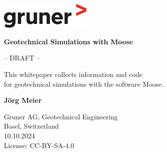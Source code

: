 \begin{titlepage}
    \begin{flushright}
        \includegraphics[width=4.5cm]{img/gruner.pdf}
    \end{flushright}
    \begin{center}
        \vspace*{5cm}

        {\Huge\textbf{Geotechnical Simulations with Moose}}

        \vspace{5cm}

        \large{-- DRAFT --}

        \vfill

        \large{This whitepaper collects information and code \\
            for geotechnical simulations with the software Moose.}

        \vfill

        \textbf{Jörg Meier}

        \vspace{0.8cm}

        Gruner AG, Geotechnical Engineering\\
        Basel, Switzerland\\

        \vspace{1cm}
        10.10.2024\\

        \vspace{1cm}
        License: CC-BY-SA-4.0

    \end{center}
\end{titlepage}